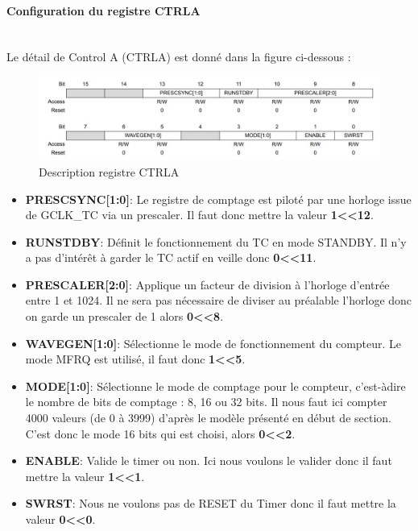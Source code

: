 \documentclass[a4paper]{article}
\begin{document}
	\paragraph{Configuration du registre CTRLA} 
	~~\\
	Le détail de Control A (CTRLA) est donné dans la figure ci-dessous :
	\begin{figure}[H]
		\centering
		\includegraphics[width=0.9\linewidth]{ControlA.jpg}
		\caption{Description registre CTRLA}
	\end{figure}
	
	\begin{itemize}
		\item {\bf PRESCSYNC[1:0]}: Le registre de comptage est piloté par une horloge issue de GCLK\_TC via un prescaler. Il faut donc mettre la valeur {\bf 1\textless\textless12}.~~\\
		\item {\bf RUNSTDBY}: Définit le fonctionnement du TC en mode STANDBY. Il n’y a pas d’intérêt à garder le TC actif en veille donc {\bf 0\textless\textless11}.~~\\
		\item {\bf PRESCALER[2:0]}: Applique un facteur de division à l’horloge d’entrée entre 1 et 1024. Il ne sera pas nécessaire de diviser au préalable l’horloge donc on garde un prescaler de 1 alors {\bf 0\textless\textless8}.~~\\
		\item {\bf WAVEGEN[1:0]}: Sélectionne le mode de fonctionnement du compteur. Le mode MFRQ est utilisé, il faut donc {\bf 1\textless\textless5}.~~\\
		\item {\bf MODE[1:0]}: Sélectionne le mode de comptage pour le compteur, c’est-àdire le nombre de bits de comptage : 8, 16 ou 32 bits. Il nous faut ici compter 4000 valeurs (de 0 à 3999) d’après le modèle présenté en début de section. C’est donc le mode 16 bits qui est choisi, alors {\bf 0\textless\textless2}.~~\\
		\item {\bf ENABLE}: Valide le timer ou non. Ici nous voulons le valider donc il faut mettre la valeur {\bf 1\textless\textless1}.~~\\
		\item {\bf SWRST}: Nous ne voulons pas de RESET du Timer donc il faut mettre la valeur {\bf 0\textless\textless0}.~~\\
	\end{itemize}
	
\end{document}
